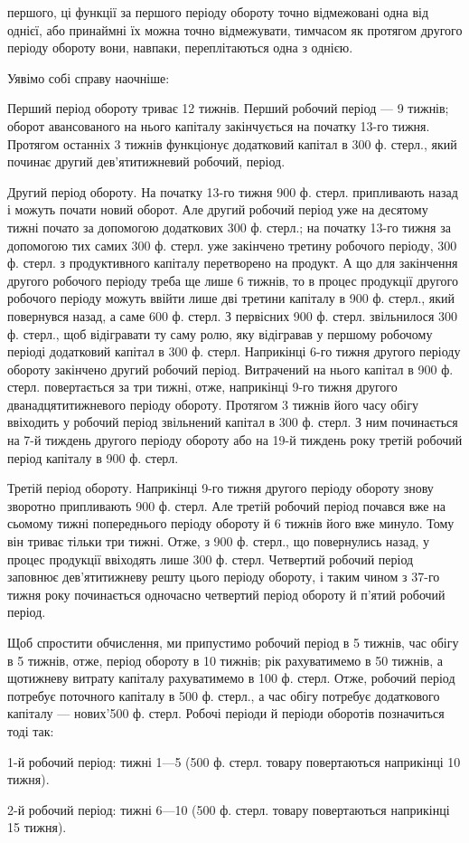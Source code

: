 \parcont{}  %
першого, ці функції за першого періоду обороту точно відмежовані одна
від однієї, або принаймні їх можна точно відмежувати, тимчасом як протягом
другого періоду обороту вони, навпаки, переплітаються одна з
однією.

Уявімо собі справу наочніше:

Перший період обороту триває 12 тижнів. Перший робочий період —
9 тижнів; оборот авансованого на нього капіталу закінчується на початку
13-го тижня. Протягом останніх 3 тижнів функціонує додатковий капітал
в 300 ф. стерл., який починає другий дев’ятитижневий робочий,
період.

Другий період обороту. На початку 13-го тижня 900 ф. стерл. припливають
назад і можуть почати новий оборот. Але другий робочий
період уже на десятому тижні почато за допомогою додаткових 300 ф.
стерл.; на початку 13-го тижня за допомогою тих самих 300 ф. стерл.
уже закінчено третину робочого періоду, 300 ф. стерл. з продуктивного
капіталу перетворено на продукт. А що для закінчення другого робочого
періоду треба ще лише 6 тижнів, то в процес продукції другого робочого
періоду можуть ввійти лише дві третини капіталу в 900 ф. стерл.,
який повернувся назад, а саме 600 ф. стерл. З первісних 900 ф. стерл.
звільнилося 300 ф. стерл., щоб відігравати ту саму ролю, яку відігравав
у першому робочому періоді додатковий капітал в 300 ф. стерл. Наприкінці
6-го тижня другого періоду обороту закінчено другий робочий
період. Витрачений на нього капітал в 900 ф. стерл. повертається за три
тижні, отже, наприкінці 9-го тижня другого дванадцятитижневого періоду
обороту. Протягом 3 тижнів його часу обігу ввіходить у робочий період
звільнений капітал в 300 ф. стерл. З ним починається на 7-й тиждень
другого періоду обороту або на 19-й тиждень року третій робочий
період капіталу в 900 ф. стерл.

Третій період обороту. Наприкінці 9-го тижня другого періоду обороту
знову зворотно припливають 900 ф. стерл. Але третій робочий
період почався вже на сьомому тижні попереднього періоду обороту й
6 тижнів його вже минуло. Тому він триває тільки три тижні. Отже,
з 900 ф. стерл., що повернулись назад, у процес продукції ввіходять
лише 300 ф. стерл. Четвертий робочий період заповнює дев’ятитижневу
решту цього періоду обороту, і таким чином з 37-го тижня року починається
одночасно четвертий період обороту й п’ятий робочий період.

Щоб спростити обчислення, ми припустимо робочий період в 5 тижнів,
час обігу в 5 тижнів, отже, період обороту в 10 тижнів; рік рахуватимемо
в 50 тижнів, а щотижневу витрату капіталу рахуватимемо в 100 ф.
стерл. Отже, робочий період потребує поточного капіталу в 500 ф. стерл.,
а час обігу потребує додаткового капіталу — нових'500 ф. стерл. Робочі
періоди й періоди оборотів позначиться тоді так:

1-й робочий період: тижні 1—5 (500 ф. стерл. товару повертаються
наприкінці 10 тижня).

2-й робочий період: тижні 6—10 (500 ф. стерл. товару повертаються
наприкінці 15 тижня).
